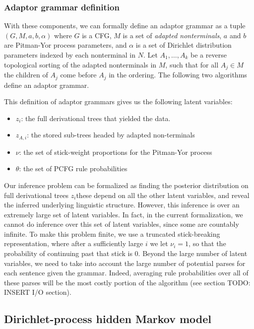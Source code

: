 \documentclass[12pt,letterpaper]{article}
\begin{document}
\subsubsection{Adaptor grammar definition}
With these components, we can formally define an adaptor grammar as a tuple $(G, M, a, b, \alpha)$ where $G$ is a CFG, $M$ is a set of \textit{adapted nonterminals}, $a$ and $b$ are Pitman-Yor process parameters, and $\alpha$ is a set of Dirichlet distribution parameters indexed by each nonterminal in $N$. Let $A_1,\ldots,A_k$ be a reverse topological sorting of the adapted nonterminals in $M$, such that for all $A_j \in M$ the children of $A_j$ come before $A_j$ in the ordering. The following two algorithms define an adaptor grammar.



This definition of adaptor grammars gives us the following latent variables: 
\begin{itemize}
\item $z_i$: the full derivational trees that yielded the data. 
\item $z_{A,i}$: the stored sub-trees headed by adapted non-terminals
\item $\nu$: the set of stick-weight proportions for the Pitman-Yor process
\item $\theta$: the set of PCFG rule probabilities 
\end{itemize}
Our inference problem can be formalized as finding the posterior distribution on full derivational trees $z_i$\textemdash these depend on all the other latent variables, and reveal the inferred underlying linguistic structure. However, this inference is over an extremely large set of latent variables. In fact, in the current formalization, we cannot do inference over this set of latent variables, since some are countably infinite. To make this problem finite, we use a truncated stick-breaking representation, where after a sufficiently large $i$ we let $\nu_i = 1$, so that the probability of continuing past that stick is 0. Beyond the large number of latent variables, we need to take into account the large number of potential parses for each sentence given the grammar. Indeed, averaging rule probabilities over all of these parses will be the most costly portion of the algorithm (see section TODO: INSERT I/O section). 

\subsection{Dirichlet-process hidden Markov model}













\appendix







\end{document}
